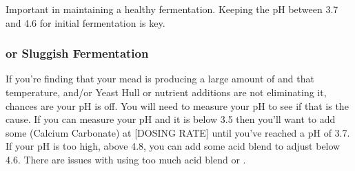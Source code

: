 \documentclass{article}
\begin{document}
  Important in maintaining a healthy fermentation. Keeping the pH between 3.7 and 4.6 for initial fermentation is key.

  \subsubsection{ or Sluggish Fermentation}
   If you're finding that your mead is producing a large amount of  and that temperature, and/or Yeast Hull or nutrient additions are not eliminating it, 
   chances are your pH is off. You will need to measure your pH to see if that is the cause. If you can measure your pH and it is
   below 3.5 then you'll want to add some  (Calcium Carbonate) at [DOSING RATE] until you've reached a pH of 3.7. If your pH is too high, above 4.8, 
   you can add some acid blend to adjust below 4.6. There are issues with using too much acid blend or .
\end{document}
